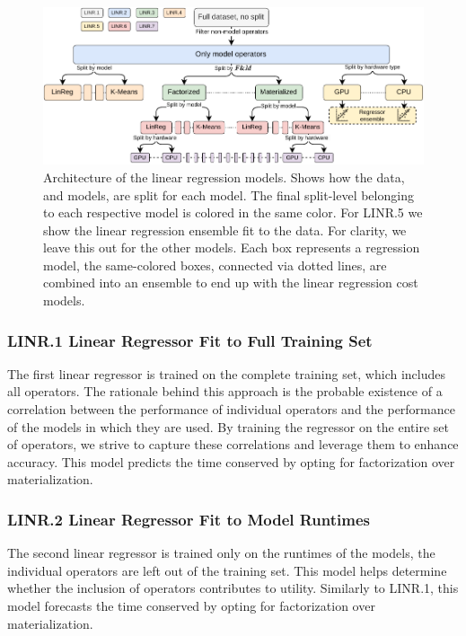 \begin{figure}[ht]
  \centering
  \includegraphics[width=\linewidth]{chapters/05_cost_estimation/figures/statistical-architecture.pdf}
  \caption[Linear Regression model Architecture]{Architecture of the linear regression models. Shows how the data, and models, are split for each model. The final split-level belonging to each respective model is colored in the same color. For LINR.5 we show the linear regression ensemble fit to the data. For clarity, we leave this out for the other models. Each box represents a regression model, the same-colored boxes, connected via dotted lines, are combined into an ensemble to end up with the linear regression cost models.}
  \label{fig:5-linear-regression-architecture}
\end{figure}

\subsubsection*{LINR.1 Linear Regressor Fit to Full Training Set}
The first linear regressor is trained on the complete training set, which includes all operators. The rationale behind this approach is the probable existence of a correlation between the performance of individual operators and the performance of the models in which they are used. By training the regressor on the entire set of operators, we strive to capture these correlations and leverage them to enhance accuracy. This model predicts the time conserved by opting for factorization over materialization.

\subsubsection*{LINR.2 Linear Regressor Fit to Model Runtimes}
The second linear regressor is trained only on the runtimes of the models, the individual operators are left out of the training set. This model helps determine whether the inclusion of operators contributes to utility. Similarly to LINR.1, this model forecasts the time conserved by opting for factorization over materialization.


